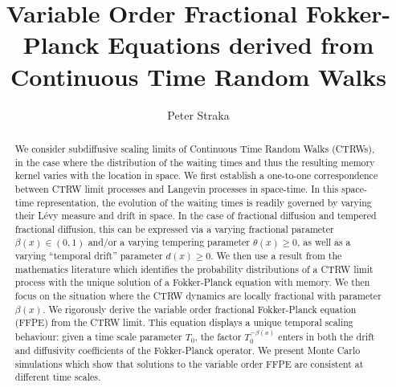 \documentclass[a4paper,12pt]{elsarticle}
\numberwithin{equation}{section}
\theoremstyle{plain}
\theoremstyle{definition}
\theoremstyle{remark}
\numberwithin{equation}{section}
\newcommand{\1}{\mathbf 1}
\begin{document}
\begin{frontmatter}

\title{Variable Order Fractional Fokker-Planck Equations derived from 
Continuous Time Random Walks}
\author[UNSW]{Peter Straka}
\address[UNSW]{School of Mathematics \& Statistics, UNSW Sydney}


\begin{abstract}
We consider subdiffusive scaling limits of Continuous Time Random Walks (CTRWs),
in the case where the distribution of the waiting times and thus
the resulting memory kernel varies with the location in space.  We first 
establish a 
one-to-one correspondence between CTRW limit processes and Langevin processes in 
space-time.  In this space-time representation, the evolution of the waiting 
times is readily governed by varying their L\'evy measure and drift in space. 
In the case of fractional diffusion and tempered fractional diffusion, this 
can be expressed via a varying fractional parameter $\beta(x) \in (0,1)$ and/or 
a varying tempering parameter $\theta(x) \ge 0$, as well as a varying 
``temporal drift'' parameter $d(x) \ge 0$. 
We then use a result from the mathematics literature which identifies the 
probability distributions of a CTRW limit process with the unique solution 
of a Fokker-Planck equation with memory.  We then focus on the situation where the CTRW 
dynamics are locally fractional with parameter $\beta(x)$.  We rigorously derive 
the variable order fractional Fokker-Planck equation (FFPE) from the CTRW limit.  This equation 
displays a unique temporal scaling behaviour: given a time scale parameter $T_0$, the factor $T_0^{-\beta(x)}$ 
enters in both the drift and diffusivity coefficients of the Fokker-Planck operator.  
We present Monte Carlo simulations which show that solutions to the variable 
order FFPE are consistent at different time scales. 
\end{abstract}






\end{frontmatter}
\end{document}
